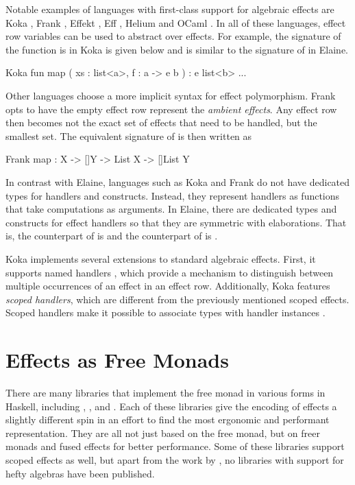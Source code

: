 Notable examples of languages with first-class support for algebraic effects are Koka \autocite{leijen_koka_2014}, Frank \autocite{lindley_be_2017}, Effekt \autocite{bach_poulsen_hefty_2023}, Eff \autocite{bauer_programming_2015}, Helium \autocite{biernacki_abstracting_2019} and OCaml \autocite{sivaramakrishnan_retrofitting_2021}. In all of these languages, effect row variables can be used to abstract over effects. For example, the signature of the  function is in Koka is given below and is similar to the signature of  in Elaine.

\begin{lst}{Koka}
fun map ( xs : list<a>, f : a -> e b ) : e list<b>
    ...
\end{lst}
%
Other languages choose a more implicit syntax for effect polymorphism. Frank \autocite{lindley_be_2017} opts to have the empty effect row represent the \emph{ambient effects}. Any effect row then becomes not the exact set of effects that need to be handled, but the smallest set. The equivalent signature of  is then written as

\begin{lst}{Frank}
map : {X -> []Y} -> List X -> []List Y
\end{lst}
%
In contrast with Elaine, languages such as Koka and Frank do not have dedicated types for handlers and  constructs. Instead, they represent handlers as functions that take computations as arguments. In Elaine, there are dedicated types and constructs for effect handlers so that they are symmetric with elaborations. That is, the counterpart of  is  and the counterpart of  is .

Koka implements several extensions to standard algebraic effects. First, it supports named handlers \autocite{xie_first-class_2022}, which provide a mechanism to distinguish between multiple occurrences of an effect in an effect row. Additionally, Koka features \emph{scoped handlers}, which are different from the previously mentioned scoped effects. Scoped handlers make it possible to associate types with handler instances \autocite{xie_first-class_2022}.

\section{Effects as Free Monads}

There are many libraries that implement the free monad in various forms in Haskell, including , ,  and . Each of these libraries give the encoding of effects a slightly different spin in an effort to find the most ergonomic and performant representation. They are all not just based on the free monad, but on freer monads \autocite{kiselyov_freer_2016} and fused effects \autocite{hinze_fusion_2015} for better performance. Some of these libraries support scoped effects as well, but apart from the work by \textcite{bach_poulsen_hefty_2023}, no libraries with support for hefty algebras have been published.

